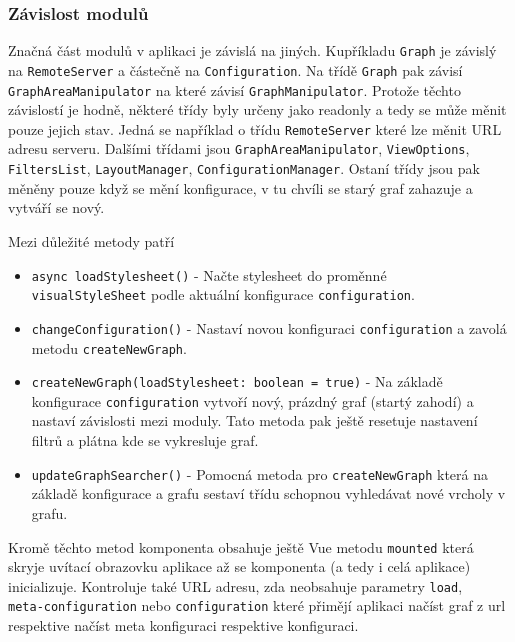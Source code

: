 \subsubsection{Závislost modulů}

Značná část modulů v aplikaci je závislá na jiných. Kupříkladu \texttt{Graph} je závislý na \texttt{RemoteServer} a částečně na \texttt{Configuration}. Na třídě \texttt{Graph} pak závisí \texttt{GraphAreaManipulator} na které závisí \texttt{GraphManipulator}. Protože těchto závislostí je hodně, některé třídy byly určeny jako readonly a tedy se může měnit pouze jejich stav. Jedná se například o třídu \texttt{RemoteServer} které lze měnit URL adresu serveru. Dalšími třídami jsou \texttt{GraphAreaManipulator}, \texttt{ViewOptions}, \texttt{FiltersList}, \texttt{LayoutManager}, \texttt{ConfigurationManager}. Ostaní třídy jsou pak měněny pouze když se mění konfigurace, v tu chvíli se starý graf zahazuje a vytváří se nový.

\medskip

Mezi důležité metody patří
\begin{itemize}
  \item \texttt{async loadStylesheet()} - Načte stylesheet do proměnné \\ \texttt{visualStyleSheet} podle aktuální konfigurace \texttt{configuration}.
  \item \texttt{changeConfiguration()} - Nastaví novou konfiguraci \texttt{configuration} a zavolá metodu \texttt{createNewGraph}.
  \item \texttt{createNewGraph(loadStylesheet: boolean = true)} - Na základě konfigurace \texttt{configuration} vytvoří nový, prázdný graf (startý zahodí) a nastaví závislosti mezi moduly. Tato metoda pak ještě resetuje nastavení filtrů a plátna kde se vykresluje graf.
  \item \texttt{updateGraphSearcher()} - Pomocná metoda pro \texttt{createNewGraph} která na základě konfigurace a grafu sestaví třídu schopnou vyhledávat nové vrcholy v grafu.
\end{itemize}

Kromě těchto metod komponenta obsahuje ještě Vue metodu \texttt{mounted} která skryje uvítací obrazovku aplikace až se komponenta (a tedy i celá aplikace) inicializuje. Kontroluje také URL adresu, zda neobsahuje parametry \texttt{load}, \\ \texttt{meta-configuration} nebo \texttt{configuration} které přimějí aplikaci načíst graf z url respektive načíst meta konfiguraci respektive konfiguraci.

